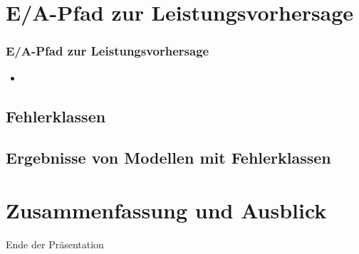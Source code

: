 \documentclass{beamer}
\begin{document}
\section{E/A-Pfad zur Leistungsvorhersage}
\begin{frame}
\frametitle{E/A-Pfad zur Leistungsvorhersage}
\begin{itemize}
	\item 
\end{itemize}
\end{frame}
\subsection{Fehlerklassen}
\subsection{Ergebnisse von Modellen mit Fehlerklassen}

\section{Zusammenfassung und Ausblick}

\begin{frame}
\Huge{\centerline{Ende der Präsentation}}
\end{frame}

\end{document}
